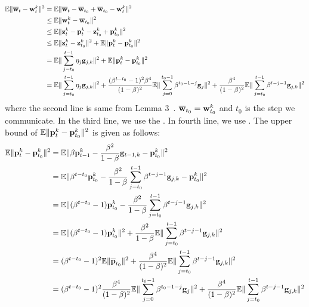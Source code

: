 \begin{align}
	\mathbb{E} \|{\overline{\mathbf{{\mathbf{w}}}}}_t -{\mathbf{w}}_t^k \|^2 & = \mathbb{E} \|{\overline{\mathbf{w}}}_t - {\overline{\mathbf{w}}}_{t_0} + {\overline{\mathbf{w}}}_{t_0}- {\mathbf{w}}_t^k \|^2\\
& \leq \mathbb{E}\|{\mathbf{w}}_t^k  - {\overline{\mathbf{w}}}_{t_0}\|^2  \\
& \leq \mathbb{E} \|{\mathbf{z}}_t^k - {\mathbf{p}}_t^k  - {\mathbf{z}}^k_{t_0} + {\mathbf{p}}^k_{t_0}\|^2  \\
& \leq \mathbb{E} \|{\mathbf{z}}_t^k - {\mathbf{z}}^k_{t_0}\|^2 + \mathbb{E}\|{\mathbf{p}}_t^k - {\mathbf{p}}^k_{t_0}\|^2  \\
& = \mathbb{E} \|\sum_{j=t_0}^{t-1}\eta_j {\mathbf{g}}_{j,k}\|^2 + \mathbb{E}\|{\mathbf{p}}_t^k - {\mathbf{p}}^k_{t_0}\|^2  \\
& = \mathbb{E} \|\sum_{j=t_0}^{t-1}\eta_j {\mathbf{g}}_{j,k}\|^2 + \frac{(\beta^{t-t_0}-1)^2\beta^4}{(1-\beta)^2}\mathbb{E}\|\sum_{j=0}^{t_0 - 1}\beta^{t_0-1-j}{\mathbf{g}}_j\|^2 + \frac{\beta^4}{(1 - \beta)^2} \mathbb{E}\|\sum_{j=t_0}^{t-1}\beta^{t-j-1}{\mathbf{g}}_{j,k}\|^2  
\end{align}
where the second line is same from Lemma 3~\cite{li2019convergence}. ${\overline{\mathbf{w}}}_{t_0} = {\mathbf{w}}^k_{t_0}$ and $t_0$ is the step we communicate. In the third line, we use the \eq{\ref{eq:nasgdzt}}. In fourth line, we use \eq{\ref{eq:recursivep}}. 
The upper bound of $\mathbb{E}\|{\mathbf{p}}_t^k - {\mathbf{p}}^k_{t_0}\|^2$ is given as follows:
\begin{align}
	\mathbb{E}\|{\mathbf{p}}_t^k - {\mathbf{p}}^k_{t_0}\|^2 & = \mathbb{E}\|\beta {\mathbf{p}}^k_{t-1} - \frac{\beta^2}{1 - \beta} {\mathbf{g}}_{t-1,k} - {\mathbf{p}}^k_{t_0}\|^2\\
	&= \mathbb{E}\|\beta^{t-t_0} {\mathbf{p}}^k_{t_0} - \frac{\beta^2}{1 - \beta} \sum_{j=t_0}^{t-1}\beta^{t-j-1}{\mathbf{g}}_{j,k} - {\mathbf{p}}^k_{t_0}\|^2\\
	&= \mathbb{E}\|(\beta^{t-t_0}-1) {\mathbf{p}}^k_{t_0} - \frac{\beta^2}{1 - \beta} \sum_{j=t_0}^{t-1}\beta^{t-j-1}{\mathbf{g}}_{j,k}\|^2\\
	&= \mathbb{E}\|(\beta^{t-t_0}-1) {\mathbf{p}}^k_{t_0}\|^2 + \frac{\beta^2}{1 - \beta} \mathbb{E}\|\sum_{j=t_0}^{t-1}\beta^{t-j-1}{\mathbf{g}}_{j,k}\|^2\\
	&= (\beta^{t-t_0}-1)^2\mathbb{E}\|{\overline{\mathbf{p}}}_{t_0}\|^2 + \frac{\beta^4}{(1 - \beta)^2} \mathbb{E}\|\sum_{j=t_0}^{t-1}\beta^{t-j-1}{\mathbf{g}}_{j,k}\|^2\\
	&= (\beta^{t-t_0}-1)^2\frac{\beta^4}{(1-\beta)^2}\mathbb{E}\|\sum_{j=0}^{t_0 - 1}\beta^{t_0-1-j}{\mathbf{g}}_j\|^2 + \frac{\beta^4}{(1 - \beta)^2} \mathbb{E}\|\sum_{j=t_0}^{t-1}\beta^{t-j-1}{\mathbf{g}}_{j,k}\|^2 \label{eq:nagcvx5}
\end{align}

